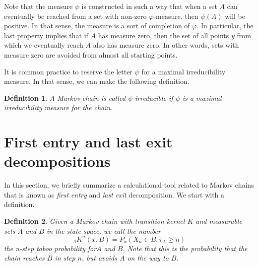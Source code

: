 \documentclass[a4paper, draft]{article}
\theoremstyle{own}
\newtheorem{defn}{Definition}[section]
\theoremstyle{remark}
\begin{document}
Note that the measure $\psi$ is constructed in such a way that when a set $A$ can eventually be reached from a set with non-zero $\varphi$-measure, then $\psi(A)$ will be positive. In that sense, the measure is a sort of completion of $\varphi$. In particular, 
the last property implies that if $A$ has measure zero, then the set of all points $y$ from which we eventually reach $A$ also has measure zero. In other words, sets with measure zero are avoided from almost all starting points. 

It is common practice to reserve the letter $\psi$ for a maximal irreducibility measure. In that sense, we can make the following definition.


\begin{defn}
	A Markov chain is called {\em $\psi$-irreducible} if $\psi$ is a maximal irreducibility measure for the chain.
\end{defn}




\section{First entry and last exit decompositions}\label{sec:firstentrylastexit}

In this section, we briefly summarize a calculational tool related to Markov chains that is known as {\em first entry} and {\em last exit} decomposition. We start with a definition.

\begin{defn}
Given a Markov chain with transition kernel $K$ and measurable sets $A$ and $B$ in the state space, we call the number
$$
{_A}K^n(x,B) = P_x(X_n \in B, \tau_A \geq n)
$$
the {\em n-step taboo probability} for$A$ and $B$. Note that this is the probability that the chain reaches $B$ in step $n$, but avoids $A$ on the way to $B$. 
\end{defn}
\end{document}
